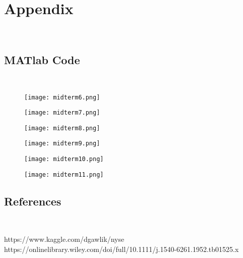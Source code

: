 \documentclass[11pt, oneside]{article}   	%
\begin{document}
 \newpage  

\section{Appendix}\

\subsection{MATlab Code}\

\begin{figure}[htbp] %
   \centering
   \texttt{[image: midterm6.png]} 
\end{figure}

\begin{figure}[htbp] %
   \centering
   \texttt{[image: midterm7.png]} 
\end{figure}

\begin{figure}[htbp] %
   \centering
   \texttt{[image: midterm8.png]} 
\end{figure}

\begin{figure}[htbp] %
   \centering
   \texttt{[image: midterm9.png]} 
\end{figure}

\begin{figure}[htbp] %
   \centering
   \texttt{[image: midterm10.png]} 
\end{figure}

\begin{figure}[htbp] %
   \centering
   \texttt{[image: midterm11.png]} 
\end{figure}

\FloatBarrier


\subsection{References}\

https://www.kaggle.com/dgawlik/nyse \\

https://onlinelibrary.wiley.com/doi/full/10.1111/j.1540-6261.1952.tb01525.x
\end{document}
